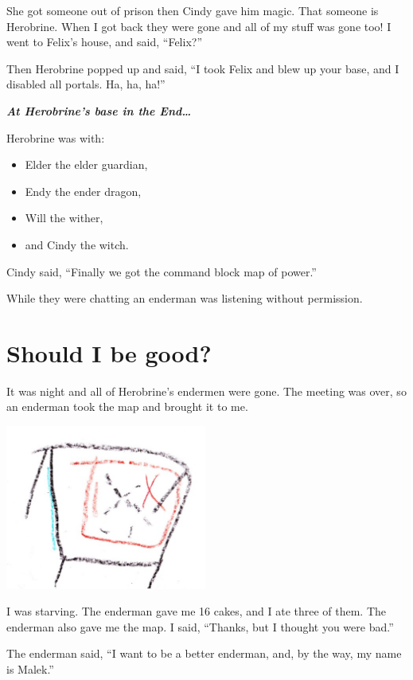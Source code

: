 \documentclass[12pt,twoside]{krantz}
\providecommand{\tightlist}{%
  \setlength{\itemsep}{0pt}\setlength{\parskip}{0pt}}
\begin{document}
She got someone out of prison then Cindy gave him magic. That someone is
Herobrine. When I got back they were gone and all of my stuff was gone
too! I went to Felix's house, and said, ``Felix?''

Then Herobrine popped up and said, ``I took Felix and blew up your base,
and I disabled all portals. Ha, ha, ha!''

\textbf{\emph{At Herobrine's base in the End\ldots{}}}

Herobrine was with:

\begin{itemize}
\tightlist
\item
  Elder the elder guardian,
\item
  Endy the ender dragon,
\item
  Will the wither,
\item
  and Cindy the witch.
\end{itemize}

Cindy said, ``Finally we got the command block map of power.''

While they were chatting an enderman was listening without permission.

\hypertarget{should-i-be-good}{%
\section{Should I be good?}\label{should-i-be-good}}

It was night and all of Herobrine's endermen were gone. The meeting was
over, so an enderman took the map and brought it to me.

\includegraphics[width=2.60417in,height=\textheight]{img/final-war/table-and-map.jpg}

I was starving. The enderman gave me 16 cakes, and I ate three of them.
The enderman also gave me the map. I said, ``Thanks, but I thought you
were bad.''

The enderman said, ``I want to be a better enderman, and, by the way, my
name is Malek.''
\end{document}
